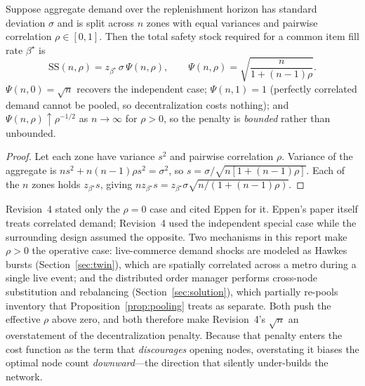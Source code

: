 \begin{proposition}\label{prop:pooling}
Suppose aggregate demand over the replenishment horizon has standard deviation $\sigma$ and is split across $n$ zones with equal variances and pairwise correlation $\rho\in[0,1]$. Then the total safety stock required for a common item fill rate $\beta^\star$ is
\begin{equation}\label{eq:pooling}
\mathrm{SS}(n,\rho)=z_{\beta^\star}\,\sigma\,\Psi(n,\rho),\qquad
\Psi(n,\rho)=\sqrt{\frac{n}{1+(n-1)\rho}} .
\end{equation}
$\Psi(n,0)=\sqrt{n}$ recovers the independent case; $\Psi(n,1)=1$ (perfectly correlated demand cannot be pooled, so decentralization costs nothing); and $\Psi(n,\rho)\uparrow\rho^{-1/2}$ as $n\to\infty$ for $\rho>0$, so the penalty is \emph{bounded} rather than unbounded.
\end{proposition}
\begin{proof}
Let each zone have variance $s^2$ and pairwise correlation $\rho$. Variance of the aggregate is $ns^2+n(n-1)\rho s^2=\sigma^2$, so $s=\sigma/\sqrt{n[1+(n-1)\rho]}$. Each of the $n$ zones holds $z_{\beta^\star}s$, giving $n z_{\beta^\star}s = z_{\beta^\star}\sigma\sqrt{n/(1+(n-1)\rho)}$.
\end{proof}

\begin{remark}
Revision~4 stated only the $\rho=0$ case and cited Eppen \cite{eppen1979} for it. Eppen's paper itself treats correlated demand; Revision~4 used the independent special case while the surrounding design assumed the opposite. Two mechanisms in this report make $\rho>0$ the operative case: live-commerce demand shocks are modeled as Hawkes bursts (Section~\ref{sec:twin}), which are spatially correlated across a metro during a single live event; and the distributed order manager performs cross-node substitution and rebalancing (Section~\ref{sec:solution}), which partially re-pools inventory that Proposition~\ref{prop:pooling} treats as separate. Both push the effective $\rho$ above zero, and both therefore make Revision~4's $\sqrt{n}$ an overstatement of the decentralization penalty. Because that penalty enters the cost function as the term that \emph{discourages} opening nodes, overstating it biases the optimal node count \emph{downward}---the direction that silently under-builds the network. 
\end{remark}

